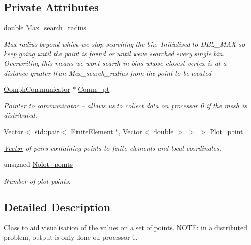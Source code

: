 \subsection*{Private Attributes}
\begin{DoxyCompactItemize}
\item 
double \hyperlink{classoomph_1_1LineVisualiser_abfcd8512571fba22e22b1952823c8744}{Max\+\_\+search\+\_\+radius}
\begin{DoxyCompactList}\small\item\em Max radius beyond which we stop searching the bin. Initialised to D\+B\+L\+\_\+\+M\+AX so keep going until the point is found or until we\textquotesingle{}ve searched every single bin. Overwriting this means we won\textquotesingle{}t search in bins whose closest vertex is at a distance greater than Max\+\_\+search\+\_\+radius from the point to be located. \end{DoxyCompactList}\item 
\hyperlink{classoomph_1_1OomphCommunicator}{Oomph\+Communicator} $\ast$ \hyperlink{classoomph_1_1LineVisualiser_a0c950d1578a20b271a1a51f58e469128}{Comm\+\_\+pt}
\begin{DoxyCompactList}\small\item\em Pointer to communicator -- allows us to collect data on processor 0 if the mesh is distributed. \end{DoxyCompactList}\item 
\hyperlink{classoomph_1_1Vector}{Vector}$<$ std\+::pair$<$ \hyperlink{classoomph_1_1FiniteElement}{Finite\+Element} $\ast$, \hyperlink{classoomph_1_1Vector}{Vector}$<$ double $>$ $>$ $>$ \hyperlink{classoomph_1_1LineVisualiser_a7579006cee454ae583710599c68b7bdd}{Plot\+\_\+point}
\begin{DoxyCompactList}\small\item\em \hyperlink{classoomph_1_1Vector}{Vector} of pairs containing points to finite elements and local coordinates. \end{DoxyCompactList}\item 
unsigned \hyperlink{classoomph_1_1LineVisualiser_a6786384d0c0c0de6df02b2b9a34a298a}{Nplot\+\_\+points}
\begin{DoxyCompactList}\small\item\em Number of plot points. \end{DoxyCompactList}\end{DoxyCompactItemize}


\subsection{Detailed Description}
Class to aid visualisation of the values on a set of points. N\+O\+TE\+: in a distributed problem, output is only done on processor 0. 

